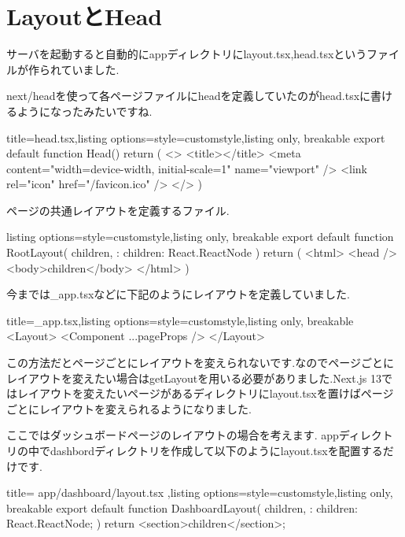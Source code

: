 \section{LayoutとHead}

サーバを起動すると自動的にappディレクトリにlayout.tsx,head.tsxというファイルが作られていました.

next/headを使って各ページファイルにheadを定義していたのがhead.tsxに書けるようになったみたいですね.

\begin{tcblisting}{title={head.tsx},listing options={style=customstyle},listing only, breakable}
  export default function Head() {
      return (
      <>
      <title></title>
      <meta content="width=device-width, initial-scale=1" name="viewport" />
      <link rel="icon" href="/favicon.ico" />
      </>
      )
    }
\end{tcblisting}



ページの共通レイアウトを定義するファイル.




\begin{tcblisting}{listing options={style=customstyle},listing only, breakable}
  export default function RootLayout({
      children,
    }: {
  children: React.ReactNode
  }) {
      return (
      <html>
        <head />
        <body>{children}</body>
      </html>
      )
    }

\end{tcblisting}


今までは\_app.tsxなどに下記のようにレイアウトを定義していました.
\begin{tcblisting}{title={\_app.tsx},listing options={style=customstyle},listing only, breakable}
  <Layout>
  <Component {...pageProps} />
  </Layout>
\end{tcblisting}




この方法だとページごとにレイアウトを変えられないです.なのでページごとにレイアウトを変えたい場合はgetLayoutを用いる必要がありました.Next.js 13ではレイアウトを変えたいページがあるディレクトリにlayout.tsxを置けばページごとにレイアウトを変えられるようになりました.


ここではダッシュボードページのレイアウトの場合を考えます.
appディレクトリの中でdashbordディレクトリを作成して以下のようにlayout.tsxを配置するだけです.



\begin{tcblisting}{title={
        app/dashboard/layout.tsx
      },listing options={style=customstyle},listing only, breakable}
  export default function DashboardLayout({
      children,
    }: {
  children: React.ReactNode;
  }) {
      return <section>{children}</section>;
    }

\end{tcblisting}





